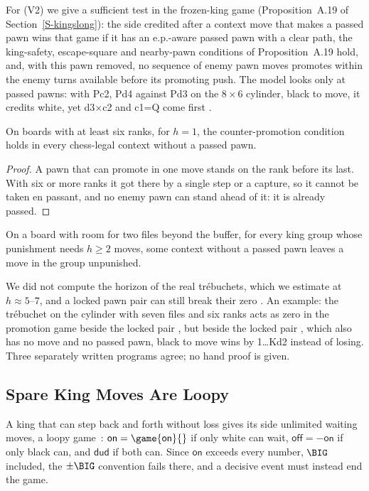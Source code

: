 For (V2) we give a sufficient test in the frozen-king game  (Proposition~A.19 of Section~\ref{S-kingslong}): the side credited
after a context move that makes a passed pawn wins that game if it has an e.p.-aware passed pawn with a clear
path, the king-safety, escape-square and nearby-pawn conditions of Proposition~A.19 hold, and, with this pawn
removed, no sequence of enemy pawn moves promotes within the enemy turns available before its promoting push. The model looks only at passed pawns: with Pc2, Pd4 against
Pd3 on the $8\times6$ cylinder, black to move, it credits white, yet d3$\times$c2 and c1=Q come first .

\begin{proposition}[\lab{S}]\label{prop:horizon1}
On boards with at least six ranks, for $h=1$, the counter-promotion condition holds in every chess-legal
context without a passed pawn.
\end{proposition}

\begin{proof}
A pawn that can promote in one move stands on the rank before its last. With six or more ranks it got there by a
single step or a capture, so it cannot be taken en passant, and no enemy pawn can stand ahead of it: it is
already passed.
\end{proof}

\begin{conjecture}\label{conj:horizon2}
On a board with room for two files beyond the buffer, for every king group whose punishment needs $h\ge2$
moves, some context without a passed pawn leaves a move in the group unpunished.
\end{conjecture}

We did not compute the horizon of the real tr\'ebuchets, which we estimate at $h\approx5$--$7$, and a locked pawn pair can still break their zero . An example: the tr\'ebuchet  on the cylinder with seven files and six ranks acts as zero in the promotion game beside the locked pair , but beside the locked pair , which also has no move and no passed pawn, black to move wins by 1\dots Kd2 instead of losing. Three separately written programs agree; no hand proof is given.

\subsection{Spare King Moves Are Loopy}

A king that can step back and forth without loss gives its side unlimited waiting moves, a loopy
game~\cite{WinningWays,Siegel2013}: $\textsf{on}=\game{\textsf{on}}{}$ if only white can wait,
$\textsf{off}=-\textsf{on}$ if only black can, and $\textsf{dud}$ if both can. Since $\textsf{on}$ exceeds every number, $\BIG$ included, the $\pm\BIG$ convention fails there, and a
decisive event must instead end the game.

